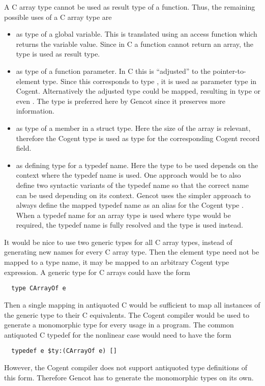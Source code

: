 A C array type cannot be used as result type of a function. Thus, the remaining possible uses of a C array type are
\begin{itemize}
\item as type of a global variable. This is translated using an access function which returns the variable
value. Since in C a function cannot return an array, the type  is used as result type.
\item as type of a function parameter. In C this is ``adjusted'' to the pointer-to-element type. Since this
corresponds to type , it is used as parameter type in Cogent. Alternatively the adjusted type
could be mapped, resulting in type  or even . The type  is preferred here
by Gencot since it preserves more information.
\item as type of a member in a struct type. Here the size of the array is relevant, therefore the Cogent type
 is used as type for the corresponding Cogent record field.
\item as defining type for a typedef name. Here the type to be used depends on the context where the typedef
name is used. One approach would be to also define two syntactic variants of the typedef name so that the 
correct name can be used depending on its context. Gencot uses the simpler approach to always define the mapped 
typedef name as an alias for the Cogent type . When a typedef name for an array type is used where 
type  would be required, the typedef name is fully resolved and the type  is used
instead.
\end{itemize}

It would be nice to use two generic types for all C array types, instead of generating new names for every 
C array type. Then the element type need not be mapped to a type name, it may be mapped
to an arbitrary Cogent type expression. A generic type for
C arrays could have the form
\begin{verbatim}
  type CArrayOf e
\end{verbatim}
Then a single mapping in antiquoted C would be sufficient to map all instances of the generic type to their 
C equivalents. The Cogent compiler would be used to generate a monomorphic type for every usage in a program. 
The common antiquoted C typedef for the nonlinear case would need to have the form 
\begin{verbatim}
  typedef e $ty:(CArrayOf e) []
\end{verbatim}
However, the Cogent compiler does not support antiquoted type definitions of this form. Therefore Gencot has to
generate the monomorphic types on its own. 

